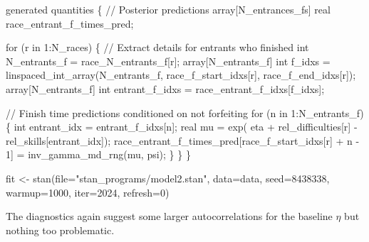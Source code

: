 \documentclass[
  letterpaper,
  DIV=11,
  numbers=noendperiod]{scrartcl}
\newenvironment{Shaded}{\begin{snugshade}}{\end{snugshade}}
\newcommand{\AttributeTok}[1]{\textcolor[rgb]{0.40,0.45,0.13}{#1}}
\newcommand{\CommentTok}[1]{\textcolor[rgb]{0.37,0.37,0.37}{#1}}
\newcommand{\ControlFlowTok}[1]{\textcolor[rgb]{0.00,0.23,0.31}{#1}}
\newcommand{\DataTypeTok}[1]{\textcolor[rgb]{0.68,0.00,0.00}{#1}}
\newcommand{\DecValTok}[1]{\textcolor[rgb]{0.68,0.00,0.00}{#1}}
\newcommand{\FunctionTok}[1]{\textcolor[rgb]{0.28,0.35,0.67}{#1}}
\newcommand{\KeywordTok}[1]{\textcolor[rgb]{0.00,0.23,0.31}{#1}}
\newcommand{\NormalTok}[1]{\textcolor[rgb]{0.00,0.23,0.31}{#1}}
\newcommand{\OtherTok}[1]{\textcolor[rgb]{0.00,0.23,0.31}{#1}}
\newcommand{\StringTok}[1]{\textcolor[rgb]{0.13,0.47,0.30}{#1}}
\begin{document}
\begin{codelisting}
\begin{Shaded}
\begin{Highlighting}[]
\KeywordTok{generated quantities}\NormalTok{ \{}
  \CommentTok{// Posterior predictions}
  \DataTypeTok{array}\NormalTok{[N\_entrances\_fs] }\DataTypeTok{real}\NormalTok{ race\_entrant\_f\_times\_pred;}

  \ControlFlowTok{for}\NormalTok{ (r }\ControlFlowTok{in} \DecValTok{1}\NormalTok{:N\_races) \{}
    \CommentTok{// Extract details for entrants who finished}
    \DataTypeTok{int}\NormalTok{ N\_entrants\_f = race\_N\_entrants\_f[r];}
    \DataTypeTok{array}\NormalTok{[N\_entrants\_f] }\DataTypeTok{int}\NormalTok{ f\_idxs}
\NormalTok{      = linspaced\_int\_array(N\_entrants\_f,}
\NormalTok{                            race\_f\_start\_idxs[r],}
\NormalTok{                            race\_f\_end\_idxs[r]);}
    \DataTypeTok{array}\NormalTok{[N\_entrants\_f] }\DataTypeTok{int}\NormalTok{ entrant\_f\_idxs}
\NormalTok{      = race\_entrant\_f\_idxs[f\_idxs];}

    \CommentTok{// Finish time predictions conditioned on not forfeiting}
    \ControlFlowTok{for}\NormalTok{ (n }\ControlFlowTok{in} \DecValTok{1}\NormalTok{:N\_entrants\_f) \{}
      \DataTypeTok{int}\NormalTok{ entrant\_idx = entrant\_f\_idxs[n];}
      \DataTypeTok{real}\NormalTok{ mu = exp(  eta}
\NormalTok{                    + rel\_difficulties[r]}
\NormalTok{                    {-} rel\_skills[entrant\_idx]);}
\NormalTok{      race\_entrant\_f\_times\_pred[race\_f\_start\_idxs[r] + n {-} }\DecValTok{1}\NormalTok{]}
\NormalTok{        = inv\_gamma\_md\_rng(mu, psi);}
\NormalTok{    \}}
\NormalTok{  \}}
\NormalTok{\}}
\end{Highlighting}
\end{Shaded}

\end{codelisting}

\begin{Shaded}
\begin{Highlighting}[]
\NormalTok{fit }\OtherTok{\textless{}{-}} \FunctionTok{stan}\NormalTok{(}\AttributeTok{file=}\StringTok{"stan\_programs/model2.stan"}\NormalTok{,}
            \AttributeTok{data=}\NormalTok{data, }\AttributeTok{seed=}\DecValTok{8438338}\NormalTok{,}
            \AttributeTok{warmup=}\DecValTok{1000}\NormalTok{, }\AttributeTok{iter=}\DecValTok{2024}\NormalTok{, }\AttributeTok{refresh=}\DecValTok{0}\NormalTok{)}
\end{Highlighting}
\end{Shaded}

The diagnostics again suggest some larger autocorrelations for the
baseline \(\eta\) but nothing too problematic.
\end{document}
